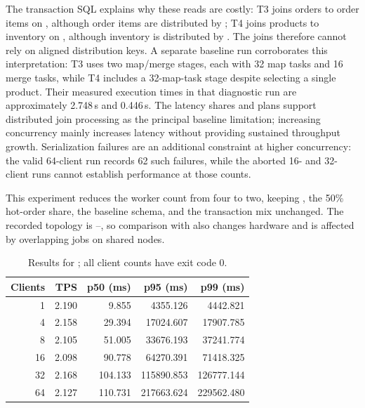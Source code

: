 The transaction SQL explains why these reads are costly:
T3 joins orders to order items on , although order items
are distributed by ; T4 joins products to inventory
on , although inventory is distributed by
.
The joins therefore cannot rely on aligned distribution keys.
A separate baseline  run corroborates this
interpretation: T3 uses two map/merge stages, each with 32 map tasks and
16 merge tasks, while T4 includes a 32-map-task stage despite selecting
a single product. Their measured execution times in that diagnostic run
are approximately 2.748\,s and 0.446\,s.
The latency shares and plans support distributed join processing as
the principal baseline limitation; increasing concurrency mainly
increases latency without providing sustained throughput growth.
Serialization failures are an additional constraint at higher concurrency:
the valid 64-client run records 62 such failures, while the aborted
16- and 32-client runs cannot establish performance at those counts.


This experiment reduces the worker count from four to two, keeping
, the 50\% hot-order share, the baseline schema, and the
transaction mix unchanged. The recorded topology is
--, so comparison with  also changes
hardware and is affected by overlapping jobs on shared nodes.

\begin{table}[htbp]
  \centering
  \begin{tabular}{@{}rrrrr@{}}
    \toprule
    Clients & TPS & p50 (ms) & p95 (ms) & p99 (ms) \\
    \midrule
     1 & 2.190 &   9.855 &   4355.126 &   4442.821 \\
     4 & 2.158 &  29.394 &  17024.607 &  17907.785 \\
     8 & 2.105 &  51.005 &  33676.193 &  37241.774 \\
    16 & 2.098 &  90.778 &  64270.391 &  71418.325 \\
    32 & 2.168 & 104.133 & 115890.853 & 126777.144 \\
    64 & 2.127 & 110.731 & 217663.624 & 229562.480 \\
    \bottomrule
  \end{tabular}
  \caption{Results for ; all client counts have exit code 0.}
  \label{tab:a0-1-results}
\end{table}

